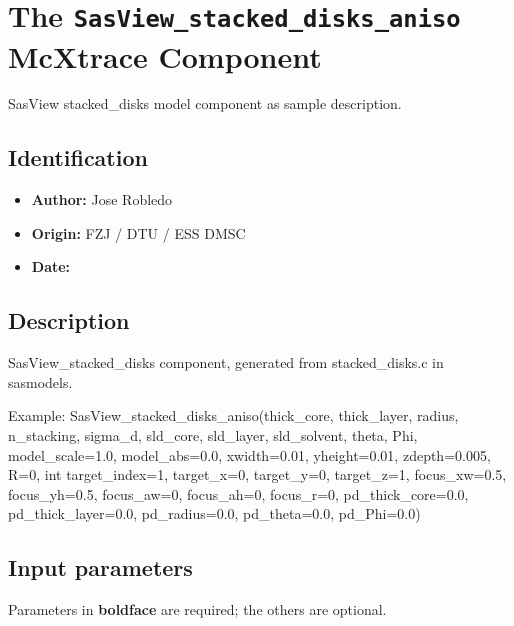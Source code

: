 \section{The \texttt{SasView\_stacked\_disks\_aniso} McXtrace Component}
SasView stacked\_disks model component as sample description.

\subsection*{Identification}
\begin{itemize}
  \item \textbf{Author:} Jose Robledo
  \item \textbf{Origin:} FZJ / DTU / ESS DMSC
  \item \textbf{Date:} 
\end{itemize}

\subsection*{Description}
SasView\_stacked\_disks component, generated from stacked\_disks.c in sasmodels.

Example: SasView\_stacked\_disks\_aniso(thick\_core, thick\_layer, radius, n\_stacking, sigma\_d, sld\_core, sld\_layer, sld\_solvent, theta, Phi, model\_scale=1.0, model\_abs=0.0, xwidth=0.01, yheight=0.01, zdepth=0.005, R=0, int target\_index=1, target\_x=0, target\_y=0, target\_z=1, focus\_xw=0.5, focus\_yh=0.5, focus\_aw=0, focus\_ah=0, focus\_r=0, pd\_thick\_core=0.0, pd\_thick\_layer=0.0, pd\_radius=0.0, pd\_theta=0.0, pd\_Phi=0.0)

\subsection*{Input parameters}
Parameters in \textbf{boldface} are required; the others are optional.

